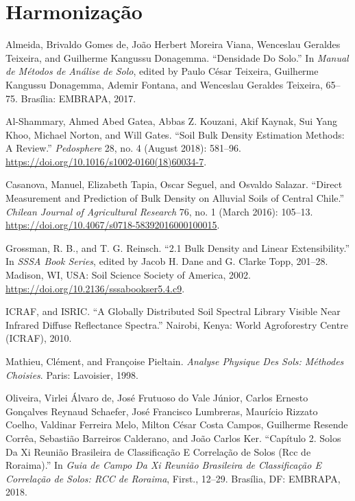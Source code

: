 \documentclass[
  a4paper,
  dvipsnames]{tufte-book}
\begin{document}
\hypertarget{harmonizauxe7uxe3o-1}{%
\section{Harmonização}\label{harmonizauxe7uxe3o-1}}

\hypertarget{refs}{}
\leavevmode\hypertarget{ref-AlmeidaEtAl2017}{}%
Almeida, Brivaldo Gomes de, João Herbert Moreira Viana, Wenceslau Geraldes Teixeira, and Guilherme Kangussu Donagemma. ``Densidade Do Solo.'' In \emph{Manual de Métodos de Análise de Solo}, edited by Paulo César Teixeira, Guilherme Kangussu Donagemma, Ademir Fontana, and Wenceslau Geraldes Teixeira, 65--75. Brasília: EMBRAPA, 2017.

\leavevmode\hypertarget{ref-Al-ShammaryEtAl2018}{}%
Al-Shammary, Ahmed Abed Gatea, Abbas Z. Kouzani, Akif Kaynak, Sui Yang Khoo, Michael Norton, and Will Gates. ``Soil Bulk Density Estimation Methods: A Review.'' \emph{Pedosphere} 28, no. 4 (August 2018): 581--96. \url{https://doi.org/10.1016/s1002-0160(18)60034-7}.

\leavevmode\hypertarget{ref-CasanovaEtAl2016}{}%
Casanova, Manuel, Elizabeth Tapia, Oscar Seguel, and Osvaldo Salazar. ``Direct Measurement and Prediction of Bulk Density on Alluvial Soils of Central Chile.'' \emph{Chilean Journal of Agricultural Research} 76, no. 1 (March 2016): 105--13. \url{https://doi.org/10.4067/s0718-58392016000100015}.

\leavevmode\hypertarget{ref-GrossmanEtAl2002}{}%
Grossman, R. B., and T. G. Reinsch. ``2.1 Bulk Density and Linear Extensibility.'' In \emph{SSSA Book Series}, edited by Jacob H. Dane and G. Clarke Topp, 201--28. Madison, WI, USA: Soil Science Society of America, 2002. \url{https://doi.org/10.2136/sssabookser5.4.c9}.

\leavevmode\hypertarget{ref-ICRAFEtAl2010}{}%
ICRAF, and ISRIC. ``A Globally Distributed Soil Spectral Library Visible Near Infrared Diffuse Reflectance Spectra.'' Nairobi, Kenya: World Agroforestry Centre (ICRAF), 2010.

\leavevmode\hypertarget{ref-MathieuEtAl1998}{}%
Mathieu, Clément, and Françoise Pieltain. \emph{Analyse Physique Des Sols: Méthodes Choisies}. Paris: Lavoisier, 1998.

\leavevmode\hypertarget{ref-OliveiraEtAl2018b}{}%
Oliveira, Virlei Álvaro de, José Frutuoso do Vale Júnior, Carlos Ernesto Gonçalves Reynaud Schaefer, José Francisco Lumbreras, Maurício Rizzato Coelho, Valdinar Ferreira Melo, Milton César Costa Campos, Guilherme Resende Corrêa, Sebastião Barreiros Calderano, and João Carlos Ker. ``Capítulo 2. Solos Da Xi Reunião Brasileira de Classificação E Correlação de Solos (Rcc de Roraima).'' In \emph{Guia de Campo Da Xi Reunião Brasileira de Classificação E Correlação de Solos: RCC de Roraima}, First., 12--29. Brasília, DF: EMBRAPA, 2018.
\end{document}
